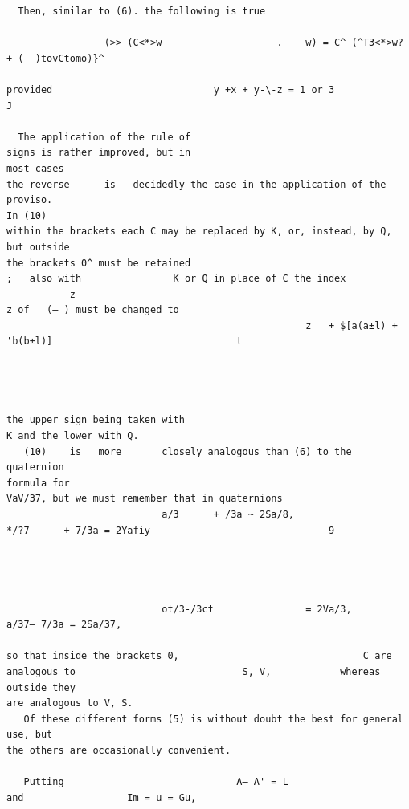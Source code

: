 \documentclass[10pt]{article}
\begin{document}
\begin{verbatim}
  Then, similar to (6). the following is true

                 (>> (C<*>w                    .    w) = C^ (^T3<*>w? + ( -)tovCtomo)}^

provided                            y +x + y-\-z = 1 or 3                                                                                    J

  The application of the rule of                                      signs is rather improved, but in                                               most cases
the reverse      is   decidedly the case in the application of the proviso.                                                                                  In (10)
within the brackets each C may be replaced by K, or, instead, by Q, but outside
the brackets 0^ must be retained                                       ;   also with                K or Q in place of C the index
           z
z of   (— ) must be changed to
                                                    z   + $[a(a±l) + 'b(b±l)]                                t




the upper sign being taken with                                       K and the lower with Q.
   (10)    is   more       closely analogous than (6) to the quaternion                                                                             formula for
VaV/37, but we must remember that in quaternions
                           a/3      + /3a ~ 2Sa/8,                               */?7      + 7/3a = 2Yafiy                               9




                           ot/3-/3ct                = 2Va/3,                     a/37— 7/3a = 2Sa/37,

so that inside the brackets 0,                                C are analogous to                             S, V,            whereas outside they
are analogous to V, S.
   Of these different forms (5) is without doubt the best for general use, but
the others are occasionally convenient.

   Putting                              A— A' = L                          and                  Im = u = Gu,


\end{verbatim}
\clearpage
\end{document}
